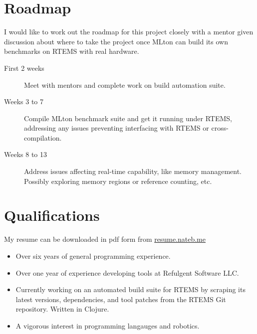 \documentclass[12pt]{article}
\begin{document}
\section{Roadmap}
I would like to work out the roadmap for this project closely with a mentor given discussion about where to take the project once MLton can build its own benchmarks on RTEMS with real hardware.
\begin{description}
\item[First 2 weeks] Meet with mentors and complete work on build automation suite.
\item[Weeks 3 to 7] Compile MLton benchmark suite and get it running under RTEMS, addressing any issues preventing interfacing with RTEMS or cross-compilation.
\item[Weeks 8 to 13] Address issues affecting real-time capability, like memory management. Possibly exploring memory regions or reference counting, etc.
\end{description}

\section{Qualifications}
My resume can be downloaded in pdf form from \url{resume.nateb.me}
\begin{itemize}
\item Over six years of general programming experience.
\item Over one year of experience developing tools at Refulgent Software LLC.
\item Currently working on an automated build suite for RTEMS by scraping its latest versions, dependencies, and tool patches from the RTEMS Git repository. Written in Clojure.
\item A vigorous interest in programming langauges and robotics.

\end{itemize}
\end{document}
